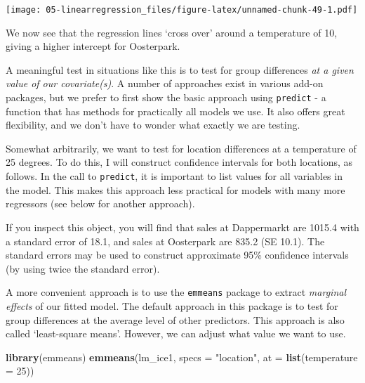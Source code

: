 \documentclass[]{book}
\newenvironment{Shaded}{\begin{snugshade}}{\end{snugshade}}
\newcommand{\CommentTok}[1]{\textcolor[rgb]{0.56,0.35,0.01}{\textit{#1}}}
\newcommand{\DataTypeTok}[1]{\textcolor[rgb]{0.13,0.29,0.53}{#1}}
\newcommand{\DecValTok}[1]{\textcolor[rgb]{0.00,0.00,0.81}{#1}}
\newcommand{\KeywordTok}[1]{\textcolor[rgb]{0.13,0.29,0.53}{\textbf{#1}}}
\newcommand{\NormalTok}[1]{#1}
\newcommand{\OperatorTok}[1]{\textcolor[rgb]{0.81,0.36,0.00}{\textbf{#1}}}
\newcommand{\OtherTok}[1]{\textcolor[rgb]{0.56,0.35,0.01}{#1}}
\newcommand{\StringTok}[1]{\textcolor[rgb]{0.31,0.60,0.02}{#1}}
\begin{document}
\texttt{[image: 05-linearregression\_files/figure-latex/unnamed-chunk-49-1.pdf]}

We now see that the regression lines `cross over' around a temperature of 10, giving a higher intercept for Oosterpark.

A meaningful test in situations like this is to test for group differences \emph{at a given value of our covariate(s)}. A number of approaches exist in various add-on packages, but we prefer to first show the basic approach using \texttt{predict} - a function that has methods for practically all models we use. It also offers great flexibility, and we don't have to wonder what exactly we are testing.

Somewhat arbitrarily, we want to test for location differences at a temperature of 25 degrees. To do this, I will construct confidence intervals for both locations, as follows. In the call to \texttt{predict}, it is important to list values for all variables in the model. This makes this approach less practical for models with many more regressors (see below for another approach).

\begin{Shaded}
\end{Shaded}

If you inspect this object, you will find that sales at Dappermarkt are 1015.4 with a standard error of 18.1, and sales at Oosterpark are 835.2 (SE 10.1). The standard errors may be used to construct approximate 95\% confidence intervals (by using twice the standard error).

A more convenient approach is to use the \texttt{emmeans} package to extract \emph{marginal effects} of our fitted model. The default approach in this package is to test for group differences at the average level of other predictors. This approach is also called `least-square means'. However, we can adjust what value we want to use.

\begin{Shaded}
\begin{Highlighting}[]
\KeywordTok{library}\NormalTok{(emmeans)}
\KeywordTok{emmeans}\NormalTok{(lm_ice1, }\DataTypeTok{specs =} \StringTok{"location"}\NormalTok{, }\DataTypeTok{at =} \KeywordTok{list}\NormalTok{(}\DataTypeTok{temperature =} \DecValTok{25}\NormalTok{))}
\end{Highlighting}
\end{Shaded}
\end{document}
